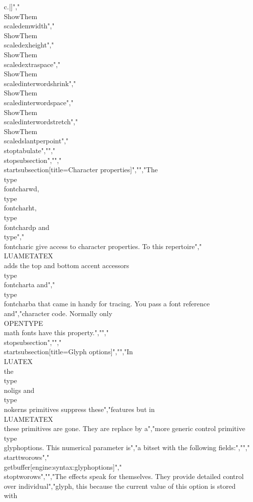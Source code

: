 c{.}|]","    \\ShowThem\\scaledemwidth","    \\ShowThem\\scaledexheight","    \\ShowThem\\scaledextraspace","    \\ShowThem\\scaledinterwordshrink","    \\ShowThem\\scaledinterwordspace","    \\ShowThem\\scaledinterwordstretch","    \\ShowThem\\scaledslantperpoint","\\stoptabulate","","\\stopsubsection","","\\startsubsection[title=Character properties]","","The \\type {\\fontcharwd}, \\type {\\fontcharht}, \\type {\\fontchardp} and \\type","{\\fontcharic} give access to character properties. To this repertoire","\\LUAMETATEX\\ adds the top and bottom accent accessors \\type {\\fontcharta} and","\\type {\\fontcharba} that came in handy for tracing. You pass a font reference and","character code. Normally only \\OPENTYPE\\ math fonts have this property.","","\\stopsubsection","","\\startsubsection[title=Glyph options]","","In \\LUATEX\\ the \\type {\\noligs} and \\type {\\nokerns} primitives suppress these","features but in \\LUAMETATEX\\ these primitives are gone. They are replace by a","more generic control primitive \\type {\\glyphoptions}. This numerical parameter is","a bitset with the following fields:","","\\starttworows","\\getbuffer[engine:syntax:glyphoptions]","\\stoptworows","","The effects speak for themselves. They provide detailed control over individual","glyph, this because the current value of this option is stored with 